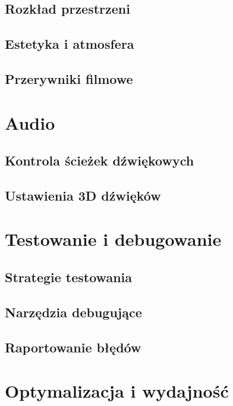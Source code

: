 \documentclass[12pt]{Tech}
\begin{document}
\subsection{Rozkład przestrzeni}

\subsection{Estetyka i atmosfera}\label{est:story}

\subsection{Przerywniki filmowe}

\newpage

\section{Audio}\label{sec:audio}

\subsection{Kontrola ścieżek dźwiękowych}

\subsection{Ustawienia 3D dźwięków}


\newpage

\section{Testowanie i debugowanie}\label{sec:test}

\subsection{Strategie testowania}

\subsection{Narzędzia debugujące}

\subsection{Raportowanie błędów}


\newpage

\section{Optymalizacja i wydajność}\label{sec:opt}

\end{document}
